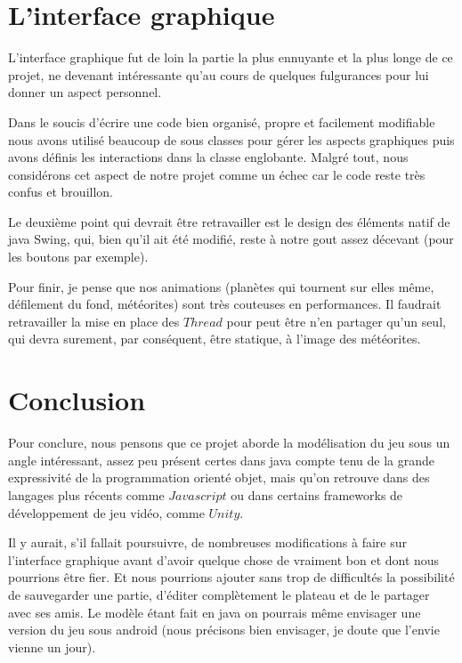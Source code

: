 \documentclass{article}
\begin{document}
\section{L'interface graphique}
L'interface graphique fut de loin la partie la plus ennuyante et la plus longe de ce projet, ne devenant intéressante qu'au cours de quelques fulgurances pour lui donner un aspect personnel.

Dans le soucis d'écrire une code bien organisé, propre et facilement modifiable nous avons utilisé beaucoup de sous classes pour gérer les aspects graphiques puis avons définis les interactions dans la classe englobante. Malgré tout, nous considérons cet aspect de notre projet comme un échec car le code reste très confus et brouillon.

Le deuxième point qui devrait être retravailler est le design des éléments natif de java Swing, qui, bien qu'il ait été modifié, reste à notre gout assez décevant (pour les boutons par exemple).

Pour finir, je pense que nos animations (planètes qui tournent sur elles même, défilement du fond, météorites) sont très couteuses en performances. Il faudrait retravailler la mise en place des $Thread$ pour peut être n'en partager qu'un seul, qui devra surement, par conséquent, être statique, à l'image des météorites.

\section{Conclusion}
Pour conclure, nous pensons que ce projet aborde la modélisation du jeu sous un angle intéressant, assez peu présent certes dans java compte tenu de la grande expressivité de la programmation orienté objet, mais qu'on retrouve dans des langages plus récents comme $Javascript$ ou dans certains frameworks de développement de jeu vidéo, comme $Unity$.

Il y aurait, s'il fallait poursuivre, de nombreuses modifications à faire sur l'interface graphique avant d'avoir quelque chose de vraiment bon et dont nous pourrions être fier. Et nous pourrions ajouter sans trop de difficultés la possibilité de sauvegarder une partie, d'éditer complètement le plateau et de le partager avec ses amis. Le modèle étant fait en java on pourrais même envisager une version du jeu sous android (nous précisons bien envisager, je doute que l'envie vienne un jour).

\newpage
\nocite{*}


\end{document}
